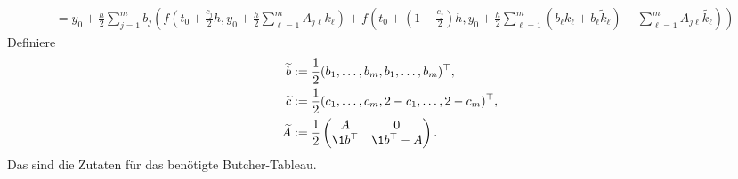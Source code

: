 \begin{solution}
\begin{enumerate}[label = \textbf{\alph*)}]
\begin{align*}
    &= y_0 + \frac{h}{2}\sum_{j=1}^mb_j\left(f(t_0+\frac{c_j}{2}h,y_0+\frac{h}{2}\sum_{\ell = 1}^m A_{j\ell}k_{\ell})+
    f(t_0 + (1-\frac{c_j}{2})h,y_0 +\frac{h}{2}\sum_{\ell=1}^m\left(b_{\ell}k_{\ell}+b_{\ell}\widetilde{k}_{\ell}\right) -
    \sum_{\ell = 1}^m A_{j\ell}\widetilde{k_{\ell}})\right)
  \end{align*}
  Definiere
  \begin{align*}
  \widetilde{b} &:= \frac{1}{2}(b_1,\dots,b_m,b_1,\dots,b_m)^{\top}, \\
  \widetilde{c} &:= \frac{1}{2}(c_1,\dots,c_m,2-c_1,\dots,2-c_m)^{\top}, \\
  \widetilde{A} &:= \frac{1}{2}\begin{pmatrix}
    A & 0 \\
    \1b^\top & \1 b^\top - A
  \end{pmatrix}.
  \end{align*}
  Das sind die Zutaten für das benötigte Butcher-Tableau.
\end{enumerate}
\end{solution}
